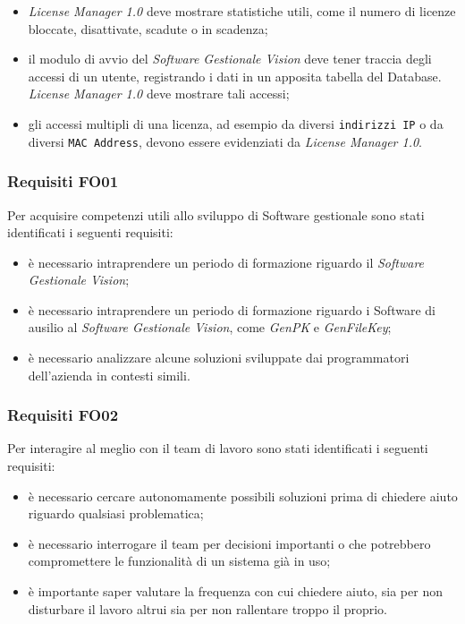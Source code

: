 \begin{itemize}

\item \textit{License Manager 1.0} deve mostrare statistiche utili, come il numero di licenze bloccate, disattivate, scadute o in scadenza;
\item il modulo di avvio del \textit{Software Gestionale Vision} deve tener traccia degli accessi di un utente, registrando i dati in un apposita tabella del Database. \textit{License Manager 1.0} deve mostrare tali accessi;
\item gli accessi multipli di una licenza, ad esempio da diversi \texttt{indirizzi IP} o da diversi \texttt{MAC Address}, devono essere evidenziati da \textit{License Manager 1.0}.

\end{itemize}
\subsubsection{Requisiti FO01}

Per acquisire competenzi utili allo sviluppo di Software gestionale sono stati identificati i seguenti requisiti:

\begin{itemize}
\item è necessario intraprendere un periodo di formazione riguardo il \textit{Software Gestionale Vision};
\item è necessario intraprendere un periodo di formazione riguardo i Software di ausilio al \textit{Software Gestionale Vision}, come \textit{GenPK} e \textit{GenFileKey};
\item è necessario analizzare alcune soluzioni sviluppate dai programmatori dell'azienda in contesti simili.
\end{itemize}

\subsubsection{Requisiti FO02}

Per interagire al meglio con il team di lavoro sono stati identificati i seguenti requisiti:

\begin{itemize}
\item è necessario cercare autonomamente possibili soluzioni prima di chiedere aiuto riguardo qualsiasi problematica;
\item è necessario interrogare il team per decisioni importanti o che potrebbero compromettere le funzionalità di un sistema già in uso;
\item è importante saper valutare la frequenza con cui chiedere aiuto, sia per non disturbare il lavoro altrui sia per non rallentare troppo il proprio.
\end{itemize}

